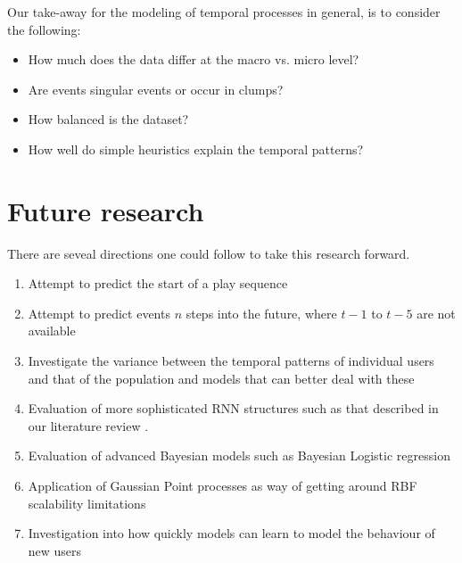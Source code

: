 Our take-away for the modeling of temporal processes in general, is to consider the following:
\begin{itemize}
	\item How much does the data differ at the macro vs. micro level?
	\item Are events singular events or occur in clumps?
	\item How balanced is the dataset?
	\item How well do simple heuristics explain the temporal patterns?
\end{itemize}

\section{Future research}

There are seveal directions one could follow to take this research forward.
\begin{enumerate}
	\item Attempt to predict the start of a play sequence
	\item Attempt to predict events $n$ steps into the future, where $t-1$ to $t-5$ are not available
	\item Investigate the variance between the temporal patterns of individual users and that of the population and models that can better deal with these
	\item Evaluation of more sophisticated RNN structures such as that described in our literature review \parencite{xiao2017modeling}.
	\item Evaluation of advanced Bayesian models such as Bayesian Logistic regression
	\item Application of Gaussian Point processes as way of getting around RBF scalability limitations
	\item Investigation into how quickly models can learn to model the behaviour of new users
\end{enumerate}